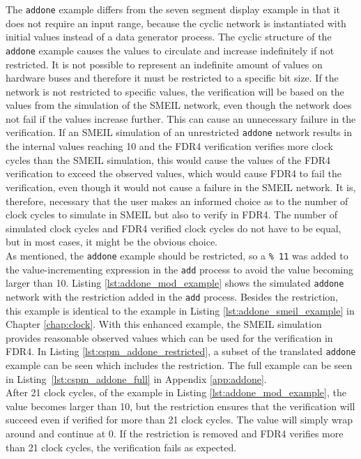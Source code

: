 The \texttt{addone} example differs from the seven segment display example in that it does not require an input range, because the cyclic network is instantiated with initial values instead of a data generator process. The cyclic structure of the \texttt{addone} example causes the values to circulate and increase indefinitely if not restricted. It is not possible to represent an indefinite amount of values on hardware buses and therefore it must be restricted to a specific bit size. If the network is not restricted to specific values, the verification will be based on the values from the simulation of the SMEIL network, even though the network does not fail if the values increase further.  This can cause an unnecessary failure in the verification.
If an SMEIL simulation of an unrestricted \texttt{addone} network results in the internal values reaching 10 and the FDR4 verification verifies more clock cycles than the SMEIL simulation, this would cause the values of the FDR4 verification to exceed the observed values, which would cause FDR4 to fail the verification, even though it would not cause a failure in the SMEIL network. It is, therefore, necessary that the user makes an informed choice as to the number of clock cycles to simulate in SMEIL but also to verify in FDR4. The number of simulated clock cycles and FDR4 verified clock cycles do not have to be equal, but in most cases, it might be the obvious choice. \\

As mentioned, the \texttt{addone} example should be restricted, so a \texttt{\% 11} was added to the value-incrementing expression in the \texttt{add} process to avoid the value becoming larger than 10. Listing \ref{lst:addone_mod_example} shows the simulated \texttt{addone} network with the restriction added in the \texttt{add} process. Besides the restriction, this example is identical to the example in Listing \ref{lst:addone_smeil_example} in Chapter \ref{chap:clock}.
With this enhanced example, the SMEIL simulation provides reasonable observed values which can be used for the verification in FDR4. In Listing \ref{lst:cspm_addone_restricted}, a subset of the translated \texttt{addone} example can be seen which includes the restriction. The full \cspm{} example can be seen in Listing~\ref{lst:cspm_addone_full} in Appendix \ref{app:addone}.\\

After 21 clock cycles, of the example in Listing \ref{lst:addone_mod_example}, the value becomes larger than 10, but the restriction ensures that the verification will succeed even if verified for more than 21 clock cycles. The value will simply wrap around and continue at 0. If the restriction is removed and FDR4 verifies more than 21 clock cycles, the verification fails as expected. \\

